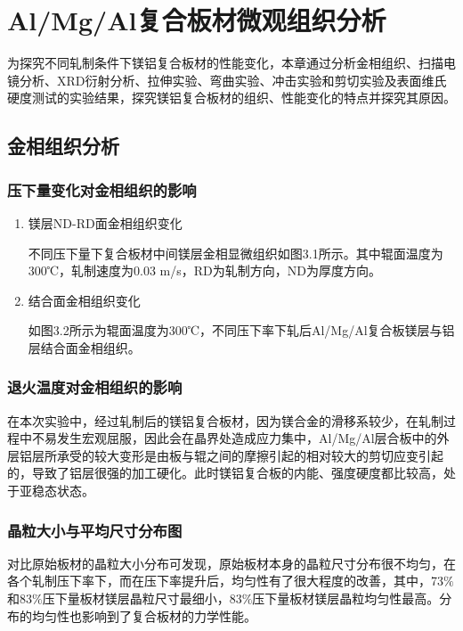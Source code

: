 \section{Al/Mg/Al复合板材微观组织分析}

	为探究不同轧制条件下镁铝复合板材的性能变化，本章通过分析金相组织、扫描电镜分析、XRD衍射分析、拉伸实验、弯曲实验、冲击实验和剪切实验及表面维氏硬度测试的实验结果，探究镁铝复合板材的组织、性能变化的特点并探究其原因。\par
	
	\subsection{金相组织分析}		  
		\subsubsection{压下量变化对金相组织的影响}
		\begin{enumerate}
			\item 镁层ND-RD面金相组织变化
			
			不同压下量下复合板材中间镁层金相显微组织如图3.1所示。其中辊面温度为300℃，轧制速度为0.03 m/s，RD为轧制方向，ND为厚度方向。
			
			\item 结合面金相组织变化
			
			如图3.2所示为辊面温度为300℃，不同压下率下轧后Al/Mg/Al复合板镁层与铝层结合面金相组织。
		\end{enumerate}
		\subsubsection{退火温度对金相组织的影响}
		在本次实验中，经过轧制后的镁铝复合板材，因为镁合金的滑移系较少，在轧制过程中不易发生宏观屈服，因此会在晶界处造成应力集中，Al/Mg/Al层合板中的外层铝层所承受的较大变形是由板与辊之间的摩擦引起的相对较大的剪切应变引起的，导致了铝层很强的加工硬化。此时镁铝复合板的内能、强度硬度都比较高，处于亚稳态状态。\par

		\subsubsection{晶粒大小与平均尺寸分布图}
		对比原始板材的晶粒大小分布可发现，原始板材本身的晶粒尺寸分布很不均匀，在各个轧制压下率下，而在压下率提升后，均匀性有了很大程度的改善，其中，73$\%$和83$\%$压下量板材镁层晶粒尺寸最细小，83$\%$压下量板材镁层晶粒均匀性最高。分布的均匀性也影响到了复合板材的力学性能。\par
